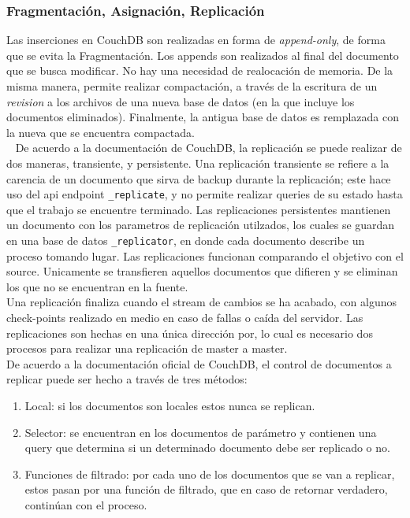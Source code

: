 \documentclass{article}
\begin{document}
            \subsubsection{Fragmentación, Asignación, Replicación}
                Las inserciones en CouchDB son realizadas en forma de \textit{append-only}, de forma que se evita la Fragmentación. Los appends son realizados al final del documento que se busca modificar. No hay una necesidad de realocación de memoria. De la misma manera, permite realizar compactación, a través de la escritura de un \textit{revision} a los archivos de una nueva base de datos (en la que incluye los documentos eliminados). Finalmente, la antigua base de datos es remplazada con la nueva que se encuentra compactada. \\ 
                De acuerdo a la documentación de CouchDB, la replicación se puede realizar de dos maneras, transiente, y persistente. Una replicación transiente se refiere a la carencia de un documento que sirva de backup durante la replicación; este hace uso del api endpoint \texttt{\_replicate}, y no permite realizar queries de su estado hasta que el trabajo se encuentre terminado. Las replicaciones persistentes mantienen un documento con los parametros de replicación utilzados, los cuales se guardan en una base de datos \texttt{\_replicator}, en donde cada documento describe un proceso tomando lugar. Las replicaciones funcionan comparando el objetivo con el source. Unicamente se transfieren aquellos documentos que difieren y se eliminan los que no se encuentran en la fuente. \\
                Una replicación finaliza cuando el stream de cambios se ha acabado, con algunos check-points realizado en medio en caso de fallas o caída del servidor. Las replicaciones son hechas en una única dirección por, lo cual es necesario dos procesos para realizar una replicación de master a master. \\
                De acuerdo a la documentación oficial de CouchDB, el control de documentos a replicar puede ser hecho a través de tres métodos: 
                \begin{enumerate}
                    \item Local: si los documentos son locales estos nunca se replican. 
                    \item Selector: se encuentran en los documentos de parámetro y contienen una query que determina si un determinado documento debe ser replicado o no. 
                    \item Funciones de filtrado: por cada uno de los documentos que se van a replicar, estos pasan por una función de filtrado, que en caso de retornar verdadero, continúan con el proceso. 
                \end{enumerate}
\end{document}
